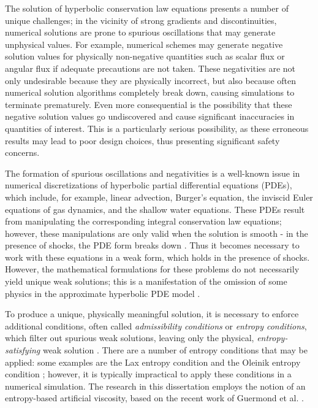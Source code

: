 The solution of hyperbolic conservation law equations
presents a number of unique challenges; in the vicinity of strong
gradients and discontinuities, numerical solutions are prone to spurious
oscillations that may generate unphysical values. For example,
numerical schemes may generate negative solution values for physically
non-negative quantities such as scalar flux or angular flux
if adequate precautions are not taken.
These negativities are not only undesirable because they are physically
incorrect, but also because often numerical solution algorithms completely break
down, causing simulations to terminate prematurely. Even more consequential
is the possibility that these negative solution values go undiscovered
and cause significant inaccuracies in quantities of interest.
This is a particularly serious possibility, as these erroneous results may
lead to poor design choices, thus presenting significant safety concerns.

The formation of spurious oscillations and negativities is a well-known issue
in numerical discretizations of hyperbolic partial differential equations (PDEs), which
include, for example, linear advection, Burger's equation, the inviscid Euler
equations of gas dynamics, and the shallow water equations.
These PDEs result from manipulating the corresponding integral conservation law
equations; however, these manipulations are only valid when the solution is
smooth - in the presence of shocks, the PDE form breaks down
\cite{leveque2002}. Thus it becomes necessary to work with these
equations in a weak form, which holds in the presence of shocks.  However, the
mathematical formulations for these problems do not necessarily yield unique
weak solutions; this is a manifestation of the omission of some physics in the
approximate hyperbolic PDE model \cite{leveque2002}.

To produce a unique, physically meaningful solution, it is necessary to
enforce additional conditions, often called \emph{admissibility conditions}
or \emph{entropy conditions}, which filter out spurious weak solutions,
leaving only the physical, \emph{entropy-satisfying} weak solution
\cite{leveque2002}.
There are a number of entropy conditions that may be applied: some
examples are the Lax entropy condition and the Oleinik entropy
condition \cite{leveque2002}; however, it is typically impractical
to apply these conditions in a numerical simulation. The research in this
dissertation employs the notion of an entropy-based artificial viscosity,
based on the recent work of Guermond et al. \cite{guermond_ev}.

